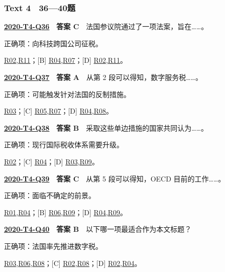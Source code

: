 \documentclass[11pt,a4paper]{article}
\begin{document}
\subsubsection{Text 4　36—40题}
\label{idx-2020-T4-Q36}
\noindent\textbf{\href{https://zj139.github.io/math-notes/english/b1daa8e77f83585490c54711/\#q36}{2020-T4-Q36}　答案 C}　法国参议院通过了一项法案，旨在……。\par\nopagebreak
\noindent 正确项：向科技跨国公司征税。\par\nopagebreak
\noindent [A] \hyperref[cat-R02]{R02},\hyperref[cat-R11]{R11}；[B] \hyperref[cat-R04]{R04},\hyperref[cat-R07]{R07}；[D] \hyperref[cat-R02]{R02},\hyperref[cat-R11]{R11}。
\par\smallskip
{}\label{idx-2020-T4-Q37}
\noindent\textbf{\href{https://zj139.github.io/math-notes/english/b1daa8e77f83585490c54711/\#q37}{2020-T4-Q37}　答案 A}　从第 2 段可以得知，数字服务税……。\par\nopagebreak
\noindent 正确项：可能触发针对法国的反制措施。\par\nopagebreak
\noindent [B] \hyperref[cat-R03]{R03}；[C] \hyperref[cat-R05]{R05},\hyperref[cat-R07]{R07}；[D] \hyperref[cat-R04]{R04},\hyperref[cat-R08]{R08}。
\par\smallskip
{}\label{idx-2020-T4-Q38}
\noindent\textbf{\href{https://zj139.github.io/math-notes/english/b1daa8e77f83585490c54711/\#q38}{2020-T4-Q38}　答案 B}　采取这些单边措施的国家共同认为……。\par\nopagebreak
\noindent 正确项：现行国际税收体系需要升级。\par\nopagebreak
\noindent [A] \hyperref[cat-R02]{R02}；[C] \hyperref[cat-R04]{R04}；[D] \hyperref[cat-R03]{R03},\hyperref[cat-R09]{R09}。
\par\smallskip
{}\label{idx-2020-T4-Q39}
\noindent\textbf{\href{https://zj139.github.io/math-notes/english/b1daa8e77f83585490c54711/\#q39}{2020-T4-Q39}　答案 C}　从第 5 段可以得知，OECD 目前的工作……。\par\nopagebreak
\noindent 正确项：面临不确定的前景。\par\nopagebreak
\noindent [A] \hyperref[cat-R01]{R01},\hyperref[cat-R04]{R04}；[B] \hyperref[cat-R06]{R06},\hyperref[cat-R09]{R09}；[D] \hyperref[cat-R04]{R04},\hyperref[cat-R09]{R09}。
\par\smallskip
{}\label{idx-2020-T4-Q40}
\noindent\textbf{\href{https://zj139.github.io/math-notes/english/b1daa8e77f83585490c54711/\#q40}{2020-T4-Q40}　答案 B}　以下哪一项最适合作为本文标题？\par\nopagebreak
\noindent 正确项：法国率先推进数字税。\par\nopagebreak
\noindent [A] \hyperref[cat-R03]{R03},\hyperref[cat-R06]{R06},\hyperref[cat-R08]{R08}；[C] \hyperref[cat-R02]{R02},\hyperref[cat-R08]{R08}；[D] \hyperref[cat-R02]{R02},\hyperref[cat-R04]{R04}。
\par\smallskip
\clearpage\setlength{\parskip}{1pt}
\end{document}
